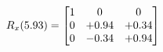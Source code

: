 \documentclass[preview]{standalone}
\begin{document}
\begin{align*}
\special{dvisvgm:raw <g id='unique000'>}R_{x}(5.93) = \begin{bmatrix}1 & 0 & 0 \\0 & +0.94 & +0.34 \\0 & -0.34 & +0.94\end{bmatrix}\special{dvisvgm:raw </g>}
\end{align*}
\end{document}
